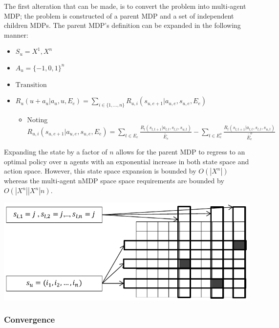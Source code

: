 \documentclass[compsoc,journal,letterpaper,10pt,draftclsnofoot,onecolumn]{IEEEtran}
\begin{document}
The first alteration that can be made, is to convert the problem into
multi-agent MDP; the problem is constructed of a parent MDP and a set of
independent children MDPs. The parent MDP's definition can be expanded
in the following manner:

\begin{itemize}
\item
  \(S_{u}  = X^{1},X^{n}\)
\item
  \(A_{u} = {\{ - 1, 0, 1\}}^{n}\)
\item
  \(\text{Transition}\)
\item
  \(R_{u}\left( u + a_{u}|a_{u}, u, E_{e} \right) = \sum_{i \in \{ 1,\ldots,n\}}R_{u,i}\left( s_{u,e + 1}|a_{u,e}, s_{u,e}, E_{e} \right)\)

  \begin{itemize}
  \item
    Noting
    \(R_{u,i}\left( s_{u,e + 1}|a_{u,e}, s_{u,e}, E_{e} \right) = \sum_{t \in E_{e}}^{\ }\frac{R_{l}\left( s_{l, t + 1}|a_{l,t}, s_{l,t}, s_{u,t} \right)}{\overline{\overline E}_{e}} - \sum_{t \in E_{e}^{o}}^{\ }\frac{R_{l}\left( s_{l,t + 1}|a_{l,t}, s_{l,t}, s_{u,t} \right)}{\overline{\overline E}_{e}^{o}}\)
  \end{itemize}
\end{itemize}

Expanding the state by a factor of \(n\) allows for the parent MDP to
regress to an optimal policy over \(\text{n\ }\)agents with an
exponential increase in both state space and action space. However, this
state space expansion is bounded by \(O(\left| X^{n} \right|)\) whereas
the multi-agent nMDP space space requirements are bounded by
\(O(\left| X^{n} \right|\left| X^{n} \right|n)\).

 
\includegraphics{media/figure8}
 


\subsubsection{Convergence}\label{convergence-1}
\end{document}
